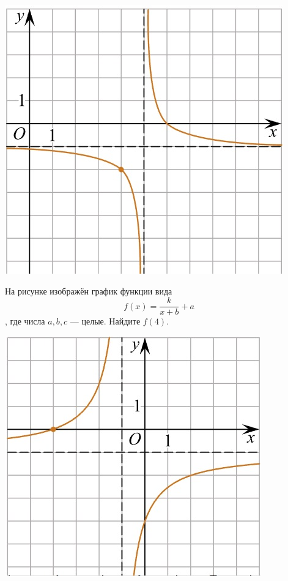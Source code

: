 \begin{class}[number=5]
\begin{listofex}
\begin{minipage}[t]{0.22\textwidth}
			\includegraphics[align=t, width=\textwidth]{pics/G101M4C5-2.jpg}
		\end{minipage}
		\item
		\begin{minipage}[t]{0.66\textwidth}
			На рисунке изображён график функции вида \[ f(x)=\dfrac{k}{x+b}+a \], где числа \(a, b, c\) --- целые. Найдите \(f(4)\).
		\end{minipage}
		\hspace{0.05\textwidth}
		\begin{minipage}[t]{0.22\textwidth}
			\includegraphics[align=t, width=\textwidth]{pics/G101M4C5-3.jpg}

\end{minipage}
\end{listofex}
\end{class}

